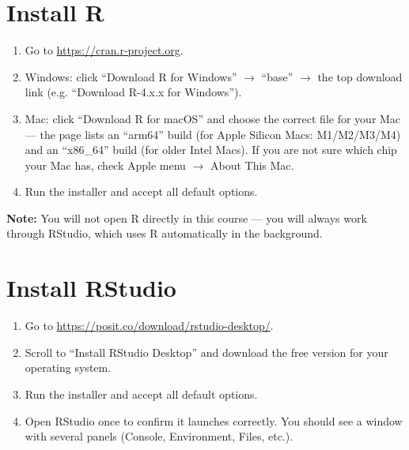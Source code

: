 \documentclass[11pt]{article}
\begin{document}
	\section{Install R}
	\begin{enumerate}
		\item Go to \url{https://cran.r-project.org}.
		\item Windows: click ``Download R for Windows'' $\rightarrow$ ``base'' $\rightarrow$ the top download link (e.g. ``Download R-4.x.x for Windows'').
		\item Mac: click ``Download R for macOS'' and choose the correct file for your Mac --- the page lists an ``arm64'' build (for Apple Silicon Macs: M1/M2/M3/M4) and an ``x86\_64'' build (for older Intel Macs). If you are not sure which chip your Mac has, check Apple menu $\rightarrow$ About This Mac.
		\item Run the installer and accept all default options.
	\end{enumerate}
	
	\begin{noteBox}
		\textbf{Note:} You will not open R directly in this course --- you will always work through RStudio, which uses R automatically in the background.
	\end{noteBox}
	

	\section{Install RStudio}
	\begin{enumerate}
		\item Go to \url{https://posit.co/download/rstudio-desktop/}.
		\item Scroll to ``Install RStudio Desktop'' and download the free version for your operating system.
		\item Run the installer and accept all default options.
		\item Open RStudio once to confirm it launches correctly. You should see a window with several panels (Console, Environment, Files, etc.).
	\end{enumerate}
	
\end{document}
